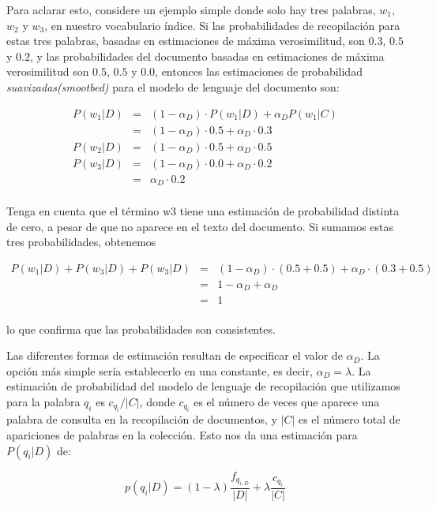 Para aclarar esto, considere un ejemplo simple donde solo hay tres palabras, $w_1$, $w_2$ y $w_3$, en nuestro vocabulario índice. Si las probabilidades de recopilación para estas tres palabras, basadas en estimaciones de máxima verosimilitud, son $0.3$, $0.5$ y $0.2$, y las probabilidades del documento basadas en estimaciones de máxima verosimilitud son $0.5$, $0.5$ y $0.0$, entonces las estimaciones de probabilidad \textit{suavizadas(smootbed)} para el modelo de lenguaje del documento son:

$$
\begin{array}{lll}
	P(w_1|D) & = & (1-\alpha_D)\cdot P(w_1|D) + \alpha_D P(w_1|C) \\
	& = & (1-\alpha_D)\cdot 0.5 + \alpha_D \cdot 0.3 \\
	P(w_2|D) & = & (1-\alpha_D)\cdot 0.5 + \alpha_D \cdot 0.5 \\
	P(w_3|D) & = & (1-\alpha_D)\cdot 0.0 + \alpha_D \cdot 0.2 \\
	& = & \alpha_D \cdot 0.2\\
\end{array}
$$

Tenga en cuenta que el término w3 tiene una estimación de probabilidad distinta de cero, a pesar de que no aparece en el texto del documento. Si sumamos estas tres probabilidades, obtenemos

$$
\begin{array}{lll}
	P(w_1|D) + P(w_3|D) + P(w_3|D)  & = & (1-\alpha_D)\cdot (0.5 + 0.5) + \alpha_D \cdot (0.3 + 0.5) \\
	& = & 1-\alpha_D + \alpha_D \\
	& = & 1 \\	
\end{array}
$$

lo que confirma que las probabilidades son consistentes.

Las diferentes formas de estimación resultan de especificar el valor de $\alpha_D$. La opción más simple sería establecerlo en una constante, es decir, $\alpha_D = \lambda$. La estimación de probabilidad del modelo de lenguaje de recopilación que utilizamos para la palabra $q_i$ es $c_{q_i} / | C |$, donde $c_{q_i}$ es el número de veces que aparece una palabra de consulta en la recopilación de documentos, y $| C |$ es el número total de apariciones de palabras en la colección. Esto nos da una estimación para $P (q_i | D)$ de:

$$p(q_i|D) = (1 - \lambda)\frac{f_{q_{i,D}}}{|D|} + \lambda\frac{c_{q_{i}}}{|C|}$$

